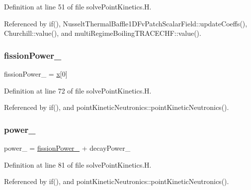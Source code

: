 Definition at line 51 of file solve\+Point\+Kinetics.\+H.



Referenced by if(), Nusselt\+Thermal\+Baffle1\+D\+Fv\+Patch\+Scalar\+Field\+::update\+Coeffs(), Churchill\+::value(), and multi\+Regime\+Boiling\+T\+R\+A\+C\+E\+C\+H\+F\+::value().

\mbox{\label{solvePointKinetics_8H_ae90376858fe578cbd789d06492f68a97}} 
\subsubsection{\texorpdfstring{fission\+Power\+\_\+}{fissionPower\_}}
{\footnotesize\ttfamily fission\+Power\+\_\+ = \hyperlink{solvePointKinetics_8H_a7155d56b187a002d8cdd92aa43066620}{x}\mbox{[}0\mbox{]}}



Definition at line 72 of file solve\+Point\+Kinetics.\+H.



Referenced by if(), and point\+Kinetic\+Neutronics\+::point\+Kinetic\+Neutronics().

\mbox{\label{solvePointKinetics_8H_a6db349ac2f1ddec3951d396b751c02a6}} 
\subsubsection{\texorpdfstring{power\+\_\+}{power\_}}
{\footnotesize\ttfamily power\+\_\+ = \hyperlink{solvePointKinetics_8H_ae90376858fe578cbd789d06492f68a97}{fission\+Power\+\_\+} + decay\+Power\+\_\+}



Definition at line 81 of file solve\+Point\+Kinetics.\+H.



Referenced by if(), and point\+Kinetic\+Neutronics\+::point\+Kinetic\+Neutronics().

\mbox{\label{solvePointKinetics_8H_ae7cb9624687e52092704d22b6384ba21}} 
